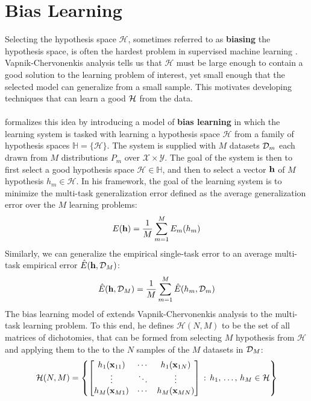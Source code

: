 \section{Bias Learning}
\label{bias_learning}
Selecting the hypothesis space $\mathcal{H}$, sometimes referred to as \textbf{biasing} the hypothesis space, is often the hardest problem in supervised machine learning \citep{baxter2000}. Vapnik-Chervonenkis analysis tells us that $\mathcal{H}$ must be large enough to contain a good solution to the learning problem of interest, yet small enough that the selected model can generalize from a small sample. This motivates developing techniques that can learn a good $\mathcal{H}$ from the data.
\\\\
\citet{baxter2000} formalizes this idea by introducing a model of \textbf{bias learning} in which the learning system is tasked with learning a hypothesis space $\mathcal{H}$ from a family of hypothesis spaces $\mathbb{H} = \{\mathcal{H}\}$. The system is supplied with $M$ datasets $\mathcal{D}_m$ each drawn from $M$ distributions $P_m$ over $\mathcal{X} \times \mathcal{Y}$. The goal of the system is then to first select a good hypothesis space $\mathcal{H} \in \mathbb{H}$, and then to select a vector $\mathbf{h}$ of $M$ hypothesis $h_m \in \mathcal{H}$. In his framework, the goal of the learning system is to minimize the multi-task generalization error defined as the average generalization error over the $M$ learning problems:
$$
E(\mathbf{h}) = \frac{1}{M}\sum\limits_{m = 1}^M E_m(h_m)
$$
Similarly, we can generalize the empirical single-task error to an average multi-task empirical error $\hat{E}(\mathbf{h}, \mathcal{D}_M)$: 
$$
\hat{E}(\mathbf{h}, \mathcal{D}_M) = \frac{1}{M}\sum\limits_{m = 1}^M\hat{E}(h_m, \mathcal{D}_m)
$$
The bias learning model of \citet{baxter2000} extends Vapnik-Chervonenkis analysis to the multi-task learning problem. To this end, he defines $\mathcal{H}(N, M)$ to be the set of all matrices of dichotomies, that can be formed from selecting $M$ hypothesis from $\mathcal{H}$ and applying them to the to the $N$ samples of the $M$ datasets in $\mathcal{D}_M$:
$$
\mathcal{H}(N, M) = \left\{ \begin{bmatrix}
	h_1(\mathbf{x}_{11}) & \cdots & h_1(\mathbf{x}_{1N}) \\
	\vdots & \ddots & \vdots \\
	h_M(\mathbf{x}_{M1}) & \cdots & h_M(\mathbf{x}_{MN})
\end{bmatrix}\, :\, h_1,\, \dots,\, h_M \in \mathcal{H} \right\}
$$

